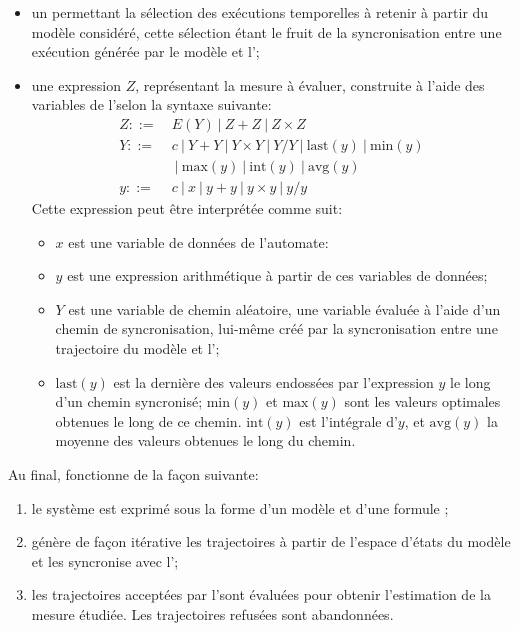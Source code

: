 \begin{itemize}
    \item un \alh permettant la sélection des exécutions temporelles à retenir à partir du modèle \rpsg considéré, cette sélection étant le fruit de la syncronisation entre une exécution générée par le modèle \rpsg et l'\alh;
    \item une expression $Z$, représentant la mesure à évaluer, construite à l'aide des variables de l'\alh selon la syntaxe suivante:
    \[
        \begin{split}
            Z ::= & \ E(Y)\ |\ Z+Z\ |\ Z \times Z\\
            Y ::= & \ c\ |\ Y+Y\ |\ Y \times Y\ |\ Y/Y\ |\ \mbox{last}(y)\ |\ \mbox{min}(y)\\
                  & \ \  |\ \mbox{max}(y)\ |\ \mbox{int}(y)\ |\ \mbox{avg}(y)\\
            y ::= & \ c\ |\ x\ |\ y+y\ |\ y \times y\ |\ y/y
        \end{split}
    \]
    Cette expression peut être interprétée comme suit:
    \begin{itemize}
        \item $x$ est une variable de données de l'automate:
        \item $y$ est une expression arithmétique à partir de ces variables de données;
        \item $Y$ est une variable de chemin aléatoire, \cad une variable évaluée à l'aide d'un chemin de syncronisation, lui-même créé par la syncronisation entre une trajectoire du modèle \rpsg et l'\alh;
        \item $\mbox{last}(y)$ est la dernière des valeurs endossées par l'expression $y$ le long d'un chemin syncronisé; $\mbox{min}(y)$ et $\mbox{max}(y)$ sont les valeurs optimales obtenues le long de ce chemin. $\mbox{int}(y)$ est l'intégrale d'$y$, et $\mbox{avg}(y)$ la moyenne des valeurs obtenues le long du chemin.
    \end{itemize}
\end{itemize}

Au final, \lsah fonctionne de la façon suivante:
\begin{enumerate}
    \item le système est exprimé sous la forme d'un modèle \rpsg et d'une formule \lsah;
    \item \lsah génère de façon itérative les trajectoires à partir de l'espace d'états du modèle \rpsg et les syncronise avec l'\alh;
    \item les trajectoires acceptées par l'\alh sont évaluées pour obtenir l'estimation de la mesure étudiée. Les trajectoires refusées sont abandonnées.
\end{enumerate}

